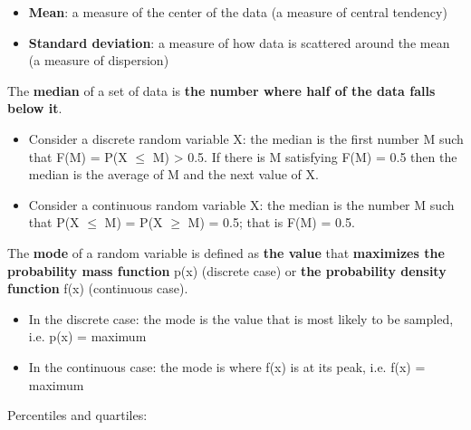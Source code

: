 \documentclass[12pt]{report}
\renewcommand{\_}{\kern-1.5pt\textunderscore\kern-1.5pt}
\begin{document}
\begin{itemize}
	\item \textbf{Mean}: a measure of the center of the data (a measure of central tendency)\par

	\item \textbf{Standard deviation}: a measure of how data is scattered around the mean (a measure of dispersion)\par


\end{itemize}
	\item The \textbf{median} of a set of data is \textbf{the number where half of the data falls below it}. \par

\begin{itemize}
	\item Consider a discrete random variable X: the median is the first number M such that F(M) = P(X $ \leq $  M) > 0.5. If there is M satisfying F(M) = 0.5 then the median is the average of M and the next value of X.\par

	\item Consider a continuous random variable X: the median is the number M such that P(X $ \leq $  M) = P(X $ \geq $  M) = 0.5; that is F(M) = 0.5.\par


\end{itemize}
	\item The \textbf{mode} of a random variable is defined as \textbf{the value} that \textbf{maximizes the probability mass function} p(x) (discrete case) or \textbf{the probability density function} f(x) (continuous case). \par

\begin{itemize}
	\item In the discrete case: the mode is the value that is most likely to be sampled, i.e. p(x) = maximum\par

	\item In the continuous case: the mode is where f(x) is at its peak, i.e. f(x) = maximum\par


\end{itemize}
	\item Percentiles and quartiles:\par
\end{document}

